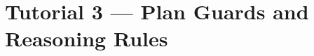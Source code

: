 {
  \let\section\subsection
  \let\subsection\subsubsection
  \let\subsubsection\paragraph
  
  
  }

\section{Tutorial 3 --- Plan Guards and Reasoning Rules}

{
  \let\section\subsection
  \let\subsection\subsubsection
  \let\subsubsection\paragraph
  
  
  }

